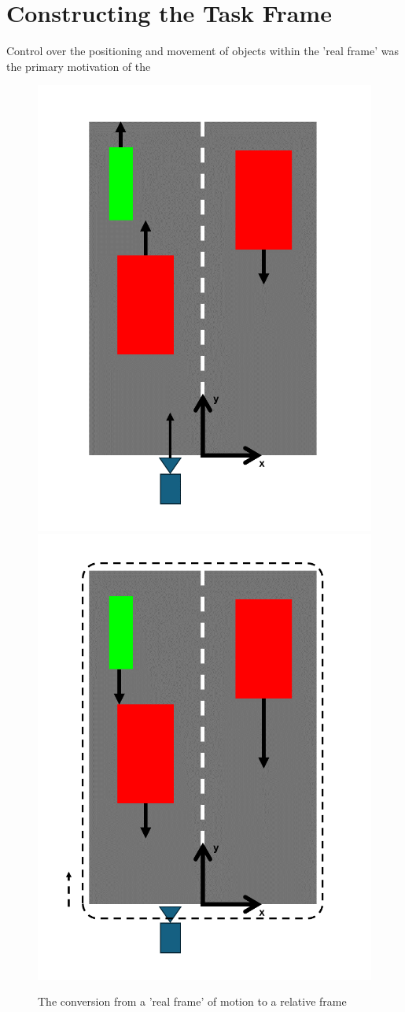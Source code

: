 \section{Constructing the Task Frame}
Control over the positioning and movement of objects within the 'real frame' was the primary motivation of the 


\begin{figure}[hbt!]
    \centering
    \includegraphics[width=0.45\linewidth]{figures/Frame1.png} \hfill
    \includegraphics[width=0.45\linewidth]{figures/Frame2.png}
    \caption{The conversion from a 'real frame' of motion to a relative frame}
    \label{fig:Frame Comparison}
\end{figure}

